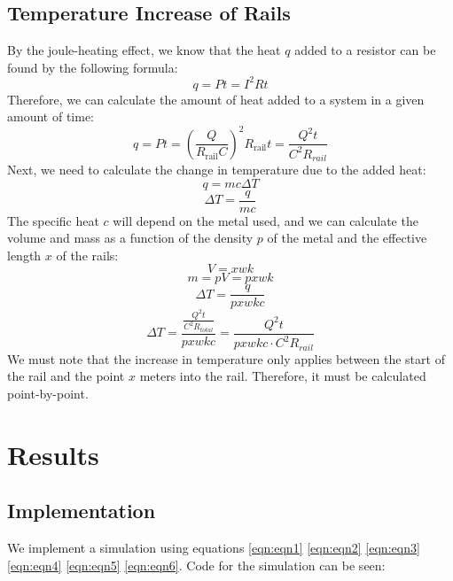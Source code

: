 \documentclass[12pt]{article}
\begin{document}
\subsection{Temperature Increase of Rails}
By the joule-heating effect, we know that the heat $q$ added to a resistor can be found by the following formula:
\begin{equation}
    q = Pt = I^2 R t 
\end{equation}
Therefore, we can calculate the amount of heat added to a system in a given amount of time:
\begin{equation}
    q = Pt = \left(\frac{Q}{R_{\text{rail}}C}\right)^2 R_{\text{rail}} t = \frac{Q^2 t}{C^2 R_{rail}}
\end{equation}
Next, we need to calculate the change in temperature due to the added heat:
\begin{equation}
    q = mc\Delta T
\end{equation}
\begin{equation}
    \Delta T = \frac{q}{mc}
\end{equation}
The specific heat $c$ will depend on the metal used, and we can calculate the volume and mass as a function of the density $p$ of the metal and the effective length $x$ of the rails:
\begin{equation}
    V = xwk
\end{equation}
\begin{equation}
    m = pV = pxwk
\end{equation}
\begin{equation}
    \Delta T = \frac{q}{pxwkc}
\end{equation}
\begin{equation}
    \Delta T = \frac{\frac{Q^2 t}{C^2 R_{total}}}{pxwkc} = \frac{Q^2 t}{pxwkc \cdot C^2 R_{rail}}
    \label{eqn:eqn6}
\end{equation}
We must note that the increase in temperature only applies between the start of the rail and the point $x$ meters into the rail. Therefore, it must be calculated point-by-point.

\section{Results}

\subsection{Implementation}
We implement a simulation using equations \eqref{eqn:eqn1} \eqref{eqn:eqn2} \eqref{eqn:eqn3} \eqref{eqn:eqn4} \eqref{eqn:eqn5} \eqref{eqn:eqn6}. Code for the simulation can be seen:
\end{document}
